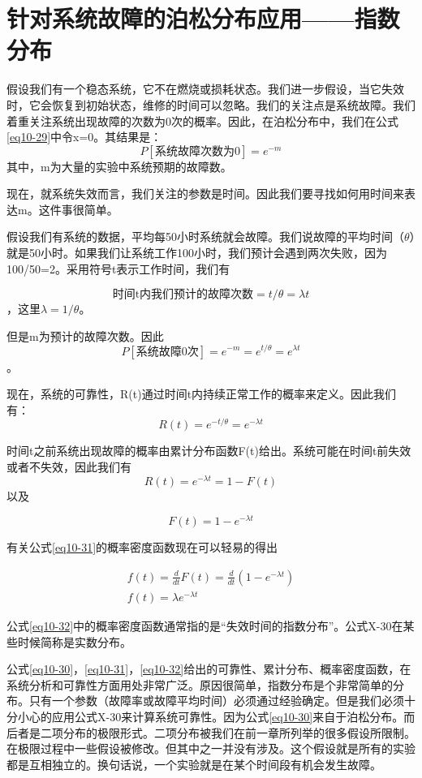 \documentclass[cn,11pt,chinese]{elegantbook}
\begin{document}
{\section{针对系统故障的泊松分布应用——指数分布}

假设我们有一个稳态系统，它不在燃烧或损耗状态。我们进一步假设，当它失效时，它会恢复到初始状态，维修的时间可以忽略。我们的关注点是系统故障。我们着重关注系统出现故障的次数为0次的概率。因此，在泊松分布中，我们在公式\ref{eq10-29}中令x=0。其结果是：
$$ P[\mbox{系统故障次数为0}]=e^{-m}$$
其中，m为大量的实验中系统预期的故障数。

现在，就系统失效而言，我们关注的参数是时间。因此我们要寻找如何用时间来表达m。这件事很简单。

假设我们有系统的数据，平均每50小时系统就会故障。我们说故障的平均时间（$\theta$）就是50小时。如果我们让系统工作100小时，我们预计会遇到两次失败，因为100/50=2。采用符号t表示工作时间，我们有

$$\mbox{时间t内我们预计的故障次数}=t/\theta=\lambda t$$，这里$\lambda = 1/\theta$。

但是m为预计的故障次数。因此
$$P[\mbox{系统故障0次}]=e^{-m}=e^{t/\theta}=e^{\lambda t}$$。

现在，系统的可靠性，R(t)通过时间t内持续正常工作的概率来定义。因此我们有：
\begin{equation}\label{eq10-30}
R(t)=e^{-t/\theta}=e^{-\lambda t}
\end{equation}


时间t之前系统出现故障的概率由累计分布函数F(t)给出。系统可能在时间t前失效或者不失效，因此我们有
$$R(t)=e^{-\lambda t}=1-F(t)$$
以及

\begin{equation}\label{eq10-31}
F(t)=1-e^{-\lambda t} 
\end{equation}

有关公式\ref{eq10-31}的概率密度函数现在可以轻易的得出

\begin{equation}\label{eq10-32}
\begin{split}
f(t)=\frac{d}{dt}F(t)=\frac{d}{dt}(1-e^{-\lambda t}) \\
f(t)=\lambda e^{-\lambda t} 
\end{split}
\end{equation}

公式\ref{eq10-32}中的概率密度函数通常指的是“失效时间的指数分布”。公式X-30在某些时候简称是实数分布。

公式\ref{eq10-30}，\ref{eq10-31}，\ref{eq10-32}给出的可靠性、累计分布、概率密度函数，在系统分析和可靠性方面用处非常广泛。原因很简单，指数分布是个非常简单的分布。只有一个参数（故障率或故障平均时间）必须通过经验确定。但是我们必须十分小心的应用公式X-30来计算系统可靠性。因为公式\ref{eq10-30}来自于泊松分布。而后者是二项分布的极限形式。二项分布被我们在前一章所列举的很多假设所限制。在极限过程中一些假设被修改。但其中之一并没有涉及。这个假设就是所有的实验都是互相独立的。换句话说，一个实验就是在某个时间段有机会发生故障。

}
\end{document}
